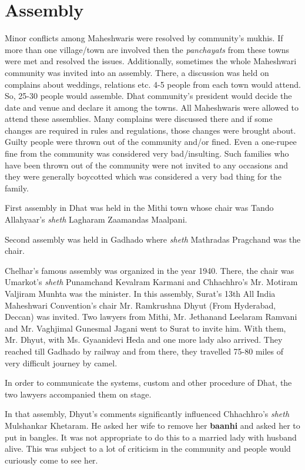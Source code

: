\chapter{Assembly}
Minor conflicts among Maheshwaris were resolved by community's mukhis. If more
than one village/town are involved then the \textit{panchayats} from these
towns were met and resolved the issues. Additionally, sometimes the whole
Maheshwari community was invited into an assembly. There, a discussion was held
on complains about weddings, relations etc. 4-5 people from each town would
attend. So, 25-30 people would assemble. Dhat community's president would
decide the date and venue and declare it among the towns. All Maheshwaris were
allowed to attend these assemblies. Many complains were discussed there and if
some changes are required in rules and regulations, those changes were brought
about. Guilty people were thrown out of the community and/or fined. Even a
one-rupee fine from the community was considered very bad/insulting. Such
families who have been thrown out of the community were not invited to any
occasions and they were generally boycotted which was considered a very bad
thing for the family. 

First assembly in Dhat was held in the Mithi town whose chair was Tando
Allahyaar's \textit{sheth} Lagharam Zaamandas Maalpani.

Second assembly was held in Gadhado where \textit{sheth} Mathradas Pragchand
was the chair.

Chelhar's famous assembly was organized in the year 1940. There, the chair was
Umarkot's \textit{sheth} Punamchand Kevalram Karmani and Chhachhro's Mr.
Motiram Valjiram Munhta was the minister. In this assembly, Surat's 13th All
India Maheshwari Convention's chair Mr. Ramkrushna Dhyut (From Hyderabad,
Deccan) was invited. Two lawyers from Mithi, Mr. Jethanand Leelaram Ramvani and
Mr. Vaghjimal Gunesmal Jagani went to Surat to invite him. With them, Mr.
Dhyut, with Ms. Gyaanidevi Heda and one more lady also arrived. They reached
till Gadhado by railway and from there, they travelled 75-80 miles of very
difficult journey by camel.

In order to communicate the systems, custom and other procedure of Dhat, the
two lawyers accompanied them on stage.

In that assembly, Dhyut's comments significantly influenced Chhachhro's
\textit{sheth} Mulshankar Khetaram. He asked her wife to remove her
\textbf{baanhi} and asked her to put in bangles. It was not appropriate to do
this to a married lady with husband alive. This was subject to a lot of
criticism in the community and people would curiously come to see her.

